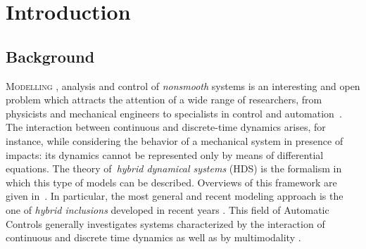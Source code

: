 \chapter{{Introduction}}
\label{chap:introduction}
\minitoc

\thispagestyle{empty}

\newpage


{}
\section{Background}

\lettrine[lines=4]{\color{brickred}M}{odelling} , analysis and control of \textit{nonsmooth} systems is an interesting and open problem which attracts the attention of a wide range of researchers, from physicists and mechanical engineers to specialists in control and automation~\cite{brogliato1999nonsmooth,stronge2018impact}.
The interaction between continuous and discrete-time dynamics arises, for instance, while considering the behavior of a mechanical system in presence of impacts: its dynamics cannot be represented only by means of differential equations. The theory of~\textit{hybrid dynamical systems} (HDS) is the formalism in which this type of models can be described. Overviews of this framework are given in~\cite{van2000introduction,haddad2006impulsive}. In particular, the most general and recent modeling approach is the one of \textit{hybrid inclusions} developed in recent years \cite{goebel2009hybrid}. This field of Automatic Controls generally investigates systems characterized by the interaction of continuous and discrete time dynamics as well as by multimodality \cite{Goebel2012}.
%
\newline

